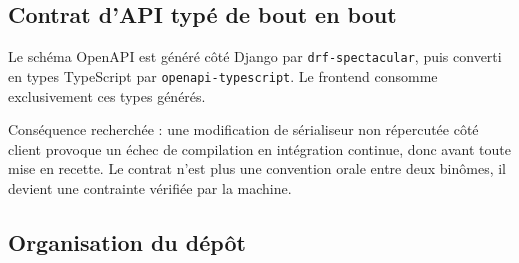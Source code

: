 \documentclass[11pt,a4paper]{article}
\begin{document}
\subsection{Contrat d'API typé de bout en bout}

\begin{decisionbox}
Le schéma OpenAPI est généré côté Django par \texttt{drf-spectacular}, puis converti en
types TypeScript par \texttt{openapi-typescript}. Le frontend consomme exclusivement
ces types générés.
\end{decisionbox}

Conséquence recherchée : une modification de sérialiseur non répercutée côté client
provoque un échec de compilation en intégration continue, donc avant toute mise en
recette. Le contrat n'est plus une convention orale entre deux binômes, il devient une
contrainte vérifiée par la machine.

\vspace{2mm}
\noindent
\begin{center}
\end{center}

\subsection{Organisation du dépôt}
\end{document}
